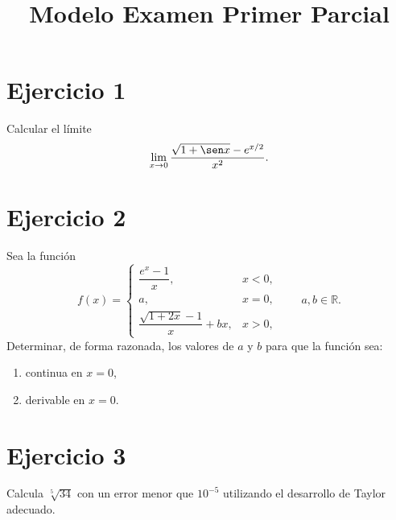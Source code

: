 \documentclass[12pt]{article}
\title{Modelo Examen Primer Parcial}
\author{}
\date{}
\begin{document}
\maketitle

\section*{Ejercicio 1}
Calcular el límite
\[
\lim_{x\to 0}\frac{\sqrt{1+\sen x}-e^{x/2}}{x^2}.
\]

\section*{Ejercicio 2}
Sea la función
\[
f(x)=
\begin{cases}
\dfrac{e^x-1}{x}, & x<0,\\[8pt]
a, & x=0,\\[8pt]
\dfrac{\sqrt{1+2x}-1}{x}+bx, & x>0,
\end{cases}
\qquad a,b\in\mathbb{R}.
\]
Determinar, de forma razonada, los valores de \(a\) y \(b\) para que la función sea:
\begin{enumerate}
    \item continua en \(x=0\),
    \item derivable en \(x=0\).
\end{enumerate}

\section*{Ejercicio 3}
Calcula \(\sqrt[5]{34}\) con un error menor que \(10^{-5}\) utilizando el desarrollo de Taylor adecuado.
\end{document}
